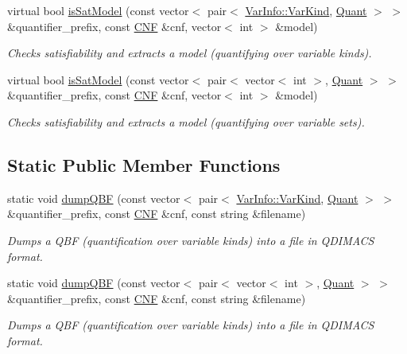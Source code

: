 \begin{DoxyCompactItemize}
virtual bool \hyperlink{classExtQBFSolver_ad66c53343ce9c03eea6e4b5e7753f1b3}{is\-Sat\-Model} (const vector$<$ pair$<$ \hyperlink{classVarInfo_a64d1da76cf84fe674e5fef9764ef11cf}{Var\-Info\-::\-Var\-Kind}, \hyperlink{classQBFSolver_ac091e263cb55286cc07b2451bcf4d3c7}{Quant} $>$ $>$ \&quantifier\-\_\-prefix, const \hyperlink{classCNF}{C\-N\-F} \&cnf, vector$<$ int $>$ \&model)
\begin{DoxyCompactList}\small\item\em Checks satisfiability and extracts a model (quantifying over variable kinds). \end{DoxyCompactList}\item 
virtual bool \hyperlink{classExtQBFSolver_a3add00496f016c2e60a188ce9daa1da1}{is\-Sat\-Model} (const vector$<$ pair$<$ vector$<$ int $>$, \hyperlink{classQBFSolver_ac091e263cb55286cc07b2451bcf4d3c7}{Quant} $>$ $>$ \&quantifier\-\_\-prefix, const \hyperlink{classCNF}{C\-N\-F} \&cnf, vector$<$ int $>$ \&model)
\begin{DoxyCompactList}\small\item\em Checks satisfiability and extracts a model (quantifying over variable sets). \end{DoxyCompactList}\end{DoxyCompactItemize}
\subsection*{Static Public Member Functions}
\begin{DoxyCompactItemize}
\item 
static void \hyperlink{classExtQBFSolver_abebb2acbb5afd5b205254246f39f3e33}{dump\-Q\-B\-F} (const vector$<$ pair$<$ \hyperlink{classVarInfo_a64d1da76cf84fe674e5fef9764ef11cf}{Var\-Info\-::\-Var\-Kind}, \hyperlink{classQBFSolver_ac091e263cb55286cc07b2451bcf4d3c7}{Quant} $>$ $>$ \&quantifier\-\_\-prefix, const \hyperlink{classCNF}{C\-N\-F} \&cnf, const string \&filename)
\begin{DoxyCompactList}\small\item\em Dumps a Q\-B\-F (quantification over variable kinds) into a file in Q\-D\-I\-M\-A\-C\-S format. \end{DoxyCompactList}\item 
static void \hyperlink{classExtQBFSolver_a7e329d1fdce2cf65390930b01cf3a32b}{dump\-Q\-B\-F} (const vector$<$ pair$<$ vector$<$ int $>$, \hyperlink{classQBFSolver_ac091e263cb55286cc07b2451bcf4d3c7}{Quant} $>$ $>$ \&quantifier\-\_\-prefix, const \hyperlink{classCNF}{C\-N\-F} \&cnf, const string \&filename)
\begin{DoxyCompactList}\small\item\em Dumps a Q\-B\-F (quantification over variable kinds) into a file in Q\-D\-I\-M\-A\-C\-S format. \end{DoxyCompactList}\end{DoxyCompactItemize}
